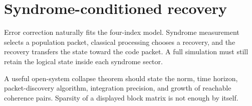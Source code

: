 \section{Syndrome-conditioned recovery}
Error correction naturally fits the four-index model. Syndrome measurement selects a population packet, classical processing chooses a recovery, and the recovery transfers the state toward the code packet. A full simulation must still retain the logical state inside each syndrome sector.

\begin{frontierbox}
A useful open-system collapse theorem should state the norm, time horizon, packet-discovery algorithm, integration precision, and growth of reachable coherence pairs. Sparsity of a displayed block matrix is not enough by itself.
\end{frontierbox}

